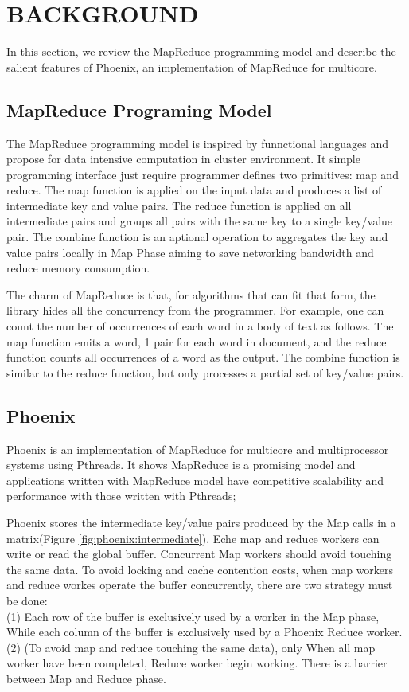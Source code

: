 \section{BACKGROUND}
In this section, we review the MapReduce programming
model and describe the salient features of Phoenix, 
an implementation of MapReduce for multicore.

\subsection{MapReduce Programing Model}
The MapReduce programming model is inspired 
by funnctional languages and 
propose for data intensive computation in cluster environment.
It simple programming interface just require programmer 
defines two primitives: map and reduce.
The map function is applied on the input data and 
produces a list of intermediate key and value pairs.
The reduce function is applied on all intermediate
pairs and  groups all pairs with the same key to a single
key/value pair. 
The combine function is an aptional operation 
to aggregates the key and value pairs locally in Map Phase 
aiming to save networking bandwidth and reduce memory consumption.

The charm of MapReduce is that, for algorithms that
can fit that form, the library hides all the concurrency
from the programmer. For example, one can count the
number of occurrences of each word in a body of text as
follows. The map function emits a word, 1
pair for each word in document, and the reduce function counts
all occurrences of a word as the output. The combine function is
similar to the reduce function, but only processes a partial set of
key/value pairs.


\subsection{Phoenix}
Phoenix is an implementation of MapReduce for multicore 
and multiprocessor systems using Pthreads.
It shows MapReduce is a promising model 
and applications written with MapReduce model
have competitive scalability and performance with those
written with Pthreads\cite{ranger2007phoenix};

Phoenix stores the intermediate key/value pairs produced by the Map calls in a 
matrix(Figure \ref{fig:phoenix:intermediate}). 
Eche map and reduce workers can write or read the global buffer. 
Concurrent Map workers should avoid touching the same data.
To avoid locking and cache contention costs, when map workers
and reduce workes operate the buffer concurrently, there are two 
strategy must be done:\\
(1) Each row of the buffer is exclusively 
used by a worker in the Map phase, While each column of the buffer 
is exclusively used by a Phoenix Reduce worker. \\
(2) (To avoid map and reduce touching the same data), 
only When all map worker have been completed, 
Reduce worker begin working. 
There is a barrier between Map and Reduce phase.

